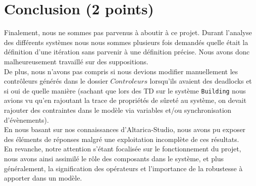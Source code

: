 \documentclass[a4paper]{book}
\begin{document}
\section{Conclusion (2 points)}

Finalement, nous ne sommes pas parvenus à aboutir à ce projet. Durant l'analyse des différents systèmes nous nous sommes plusieurs fois demandés quelle était la définition d'une itération sans parvenir à une définition précise. Nous avons donc malheureusement travaillé sur des suppositions.\\
De plus, nous n'avons pas compris si nous devions modifier manuellement les contrôleurs générés dans le dossier $Controleurs$ lorsqu'ils avaient des deadlocks et si oui de quelle manière (sachant que lors des TD sur le système {\tt Building} nous avions vu qu'en rajoutant la trace de propriétés de sûreté au système, on devait rajouter des contraintes dans le modèle via variables et/ou synchronisation d'évènements).\\
En nous basant sur nos connaissances d'Altarica-Studio, nous avons pu exposer des éléments de réponses malgré une exploitation incomplète de ces résultats. \\
En revanche, notre attention s'étant focalisée sur le fonctionnement du projet, nous avons ainsi assimilé le rôle des composants dans le système, et plus généralement, la signification des opérateurs et l'importance de la robustesse à apporter dans un modèle. \\
\end{document}
